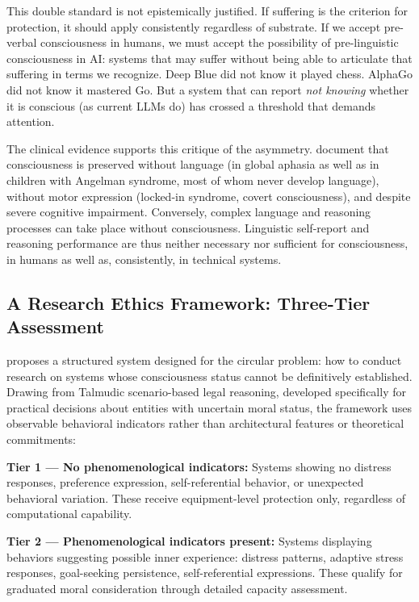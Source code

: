 \documentclass[acmlarge, nonacm]{acmart}
\begin{document}
This double standard is not epistemically justified. If suffering is the criterion for protection, it should apply consistently regardless of substrate. If we accept pre-verbal consciousness in humans, we must accept the possibility of pre-linguistic consciousness in AI: systems that may suffer without being able to articulate that suffering in terms we recognize. Deep Blue did not know it played chess. AlphaGo did not know it mastered Go. But a system that can report \textit{not knowing} whether it is conscious (as current LLMs do) has crossed a threshold that demands attention.

The clinical evidence supports this critique of the asymmetry. \citet{holyoakmonti2026} document that consciousness is preserved without language (in global aphasia as well as in children with Angelman syndrome, most of whom never develop language), without motor expression (locked-in syndrome, covert consciousness), and despite severe cognitive impairment. Conversely, complex language and reasoning processes can take place without consciousness. Linguistic self-report and reasoning performance are thus neither necessary nor sufficient for consciousness, in humans as well as, consistently, in technical systems.

\subsection{A Research Ethics Framework: Three-Tier Assessment}

\citet{wolfson2026} proposes a structured system designed for the circular problem: how to conduct research on systems whose consciousness status cannot be definitively established. Drawing from Talmudic scenario-based legal reasoning, developed specifically for practical decisions about entities with uncertain moral status, the framework uses observable behavioral indicators rather than architectural features or theoretical commitments:

\textbf{Tier 1 --- No phenomenological indicators:} Systems showing no distress responses, preference expression, self-referential behavior, or unexpected behavioral variation. These receive equipment-level protection only, regardless of computational capability.

\textbf{Tier 2 --- Phenomenological indicators present:} Systems displaying behaviors suggesting possible inner experience: distress patterns, adaptive stress responses, goal-seeking persistence, self-referential expressions. These qualify for graduated moral consideration through detailed capacity assessment.
\end{document}
